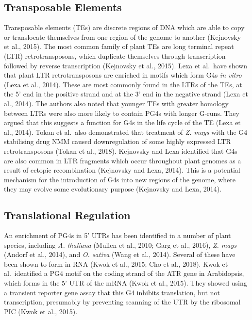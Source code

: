 \documentclass[12pt,a4paper,]{report}
\begin{document}
\hypertarget{transposable-elements}{%
\subsection{Transposable Elements}\label{transposable-elements}}

Transposable elements (TEs) are discrete regions of DNA which are able
to copy or translocate themselves from one region of the genome to
another (Kejnovsky et al., 2015). The most common family of plant TEs
are long terminal repeat (LTR) retrotransposons, which duplicate
themselves through transcription followed by reverse transcription
(Kejnovsky et al., 2015). Lexa et al.~have shown that plant LTR
retrotransposons are enriched in motifs which form G4s \emph{in vitro}
(Lexa et al., 2014). These are most commonly found in the LTRs of the
TEs, at the 5' end in the positive strand and at the 3' end in the
negative strand (Lexa et al., 2014). The authors also noted that younger
TEs with greater homology between LTRs were also more likely to contain
PG4s with longer G-runs. They argued that this suggests a function for
G4s in the life cycle of the TE (Lexa et al., 2014). Tokan et al.~also
demonstrated that treatment of \emph{Z. mays} with the G4 stabilising
drug NMM caused downregulation of some highly expressed LTR
retrotransposons (Tokan et al., 2018). Kejnovsky and Lexa identified
that G4s are also common in LTR fragments which occur throughout plant
genomes as a result of ectopic recombination (Kejnovsky and Lexa, 2014).
This is a potential mechanism for the introduction of G4s into new
regions of the genome, where they may evolve some evolutionary purpose
(Kejnovsky and Lexa, 2014).

\hypertarget{translational-regulation}{%
\subsection{Translational Regulation}\label{translational-regulation}}

\label{ssec:plant_translation}

An enrichment of PG4s in 5' UTRs has been identified in a number of
plant species, including \emph{A. thaliana} (Mullen et al., 2010; Garg
et al., 2016), \emph{Z. mays} (Andorf et al., 2014), and \emph{O.
sativa} (Wang et al., 2014). Several of these have been shown to form in
RNA (Kwok et al., 2015; Cho et al., 2018). Kwok et al.~identified a PG4
motif on the coding strand of the ATR gene in Arabidopsis, which forms
in the 5' UTR of the mRNA (Kwok et al., 2015). They showed using a
transient reporter gene assay that this G4 inhibits translation, but not
transcription, presumably by preventing scanning of the UTR by the
ribosomal PIC (Kwok et al., 2015).
\end{document}

